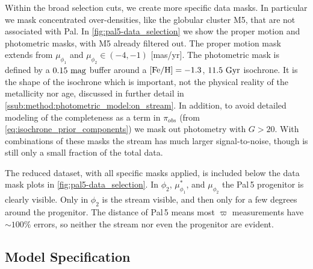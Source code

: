 \documentclass[twocolumn, linenumbers]{aastex631}
\newcommand{\stream}[1]{#1}
\newcommand{\mcal}[1]{\mathcal{#1}}
\newcommand{\prior}{\mcal{\pi}}
\newcommand{\parallax}{\varpi}
\begin{document}
        Within the broad selection cuts, we create more specific data masks.  In
        particular we mask concentrated over-densities, like the globular
        cluster \stream{M5}, that are not associated with \stream{Pal}.  In
        \autoref{fig:pal5-data_selection} we show the proper motion and
        photometric masks, with \stream{M5} already filtered out.  The proper
        motion mask extends from $\mu_{\phi_1}$ and $\mu_{\phi_2} \in (-4, -1)$
        [mas/yr].  The photometric mask is defined by a $0.15 \ \rm{mag}$ buffer
        around a $[\rm{Fe}/{H}] = -1.3$, $11.5 \ \rm{Gyr}$ isochrone. It is the
        shape of the isochrone which is important, not the physical reality of
        the metallicity nor age, discussed in further detail in
        \autoref{ssub:method:photometric_model:on_stream}.  In addition, to
        avoid detailed modeling of the completeness as a term in $\prior_{obs}$
        (from \autoref{eq:isochrone_prior_components}) we mask out photometry
        with $G > 20$.  With combinations of these masks the stream has much
        larger signal-to-noise, though is still only a small fraction of the
        total data.

        The reduced dataset, with all specific masks applied, is included below
        the data mask plots in \autoref{fig:pal5-data_selection}. In $\phi_2$,
        $\mu_{\phi_1}^*$, and $\mu_{\phi_2}$ the \stream{Pal\,5} progenitor is
        clearly visible. Only in $\phi_2$ is the stream visible, and then only
        for a few degrees around the progenitor. The distance of \stream{Pal\,5}
        means most $\parallax$ measurements have $\sim 100\%$ errors, so neither
        the stream nor even the progenitor are evident.


    \subsection{Model Specification} \label{sub:results_pal5:model}
\end{document}
